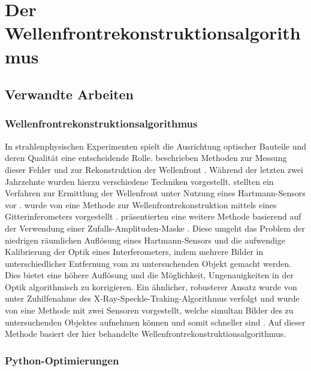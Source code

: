\chapter{Der Wellenfrontrekonstruktionsalgorithmus}

\section{Verwandte Arbeiten}

\subsection{Wellenfrontrekonstruktionsalgorithmus}

In strahlenphysischen Experimenten spielt die Ausrichtung optischer Bauteile und deren Qualität eine entscheidende Rolle. \citeauthor{GNS+11} beschrieben \citeyear{GNS+11} Methoden zur Messung dieser Fehler und zur Rekonstruktion der Wellenfront \cite{GNS+11}. Während der letzten zwei Jahrzehnte wurden hierzu verschiedene Techniken vorgestellt. \citeauthor{MZI+03} stellten \citeyear{MZI+03} ein Verfahren zur Ermittlung der Wellenfront unter Nutzung eines Hartmann-Sensors vor \cite{MZI+03}. \citeyear{WND+05} wurde von \citeauthor{WND+05} eine Methode zur Wellenfrontrekonstruktion mittels eines Gitterinferometers vorgestellt \cite{WND+05}. \citeauthor{APO+07} präsentierten \citeyear{APO+07} eine weitere Methode basierend auf der Verwendung einer Zufalls-Amplituden-Maske \cite{APO+07}. Diese umgeht das Problem der niedrigen räumlichen Auflösung eines Hartmann-Sensors und die aufwendige Kalibrierung der Optik eines Interferometers, indem mehrere Bilder in unterschiedlicher Entfernung vom zu untersuchenden Objekt gemacht werden. Dies bietet eine höhere Auflösung und die Möglichkeit, Ungenauigkeiten in der Optik algorithmisch zu korrigieren. Ein ähnlicher, robusterer Ansatz wurde \citeyear{Ber12} von \citeauthor{Ber12} unter Zuhilfenahme des X-Ray-Speckle-Traking-Algorithmus verfolgt \cite{Ber12} und \citeyear{Ber13} wurde von \citeauthor{Ber13} eine Methode mit zwei Sensoren vorgestellt, welche simultan Bilder des zu untersuchenden Objektes aufnehmen können und somit schneller sind \cite{Ber13}. Auf dieser Methode basiert der hier behandelte Wellenfrontrekonstruktionsalgorithmus. 

\subsection{Python-Optimierungen}

